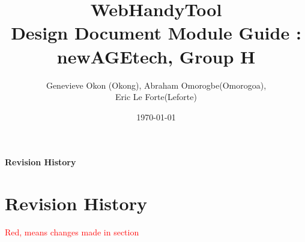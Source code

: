 \documentclass[titlepage]{article}
\begin{document}
\title{WebHandyTool \\
 Design Document Module Guide : newAGEtech, Group H }
\author{Genevieve Okon (Okong), Abraham Omorogbe(Omorogoa),\\
 Eric Le Forte(Leforte)}
\date{\today}
\maketitle


\tableofcontents
\listoffigures
\listoftables

\textbf{Revision History} \\ \normalsize
\pagebreak

\section{Revision History}
\textcolor{red}{Red, means changes made in section}
\end{document}
